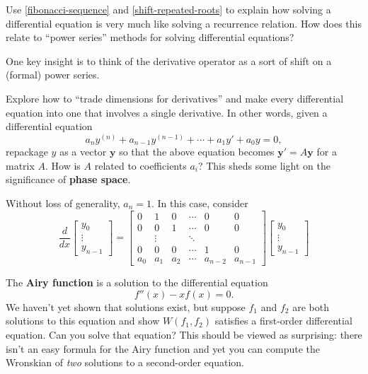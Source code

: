\documentclass{homework}
\begin{document}
\begin{problem}
  Use \ref{fibonacci-sequence} and \ref{shift-repeated-roots} to
  explain how solving a differential equation is very much like
  solving a recurrence relation.  How does this relate to ``power
  series'' methods for solving differential equations?
\end{problem}

\begin{solution}
  One key insight is to think of the derivative operator as a sort of
  shift on a (formal) power series.
\end{solution}

\begin{problem}\label{introduction-phase-space}Explore how to ``trade dimensions for derivatives'' and make every differential equation into one that involves a single derivative.  In other words, given a differential equation
  \[
    a_n y^{(n)} + a_{n-1} y^{(n-1)} + \cdots + a_1 y' + a_0 y  = 0,
  \]
  repackage $y$ as a vector $\textbf{y}$ so that the above equation becomes $\textbf{y}' = A \textbf{y}$ for a matrix $A$.  How is $A$ related to coefficients $a_i$?  This sheds some light on the significance of \textbf{phase space}.
\end{problem}

\begin{solution}
  Without loss of generality, $a_n = 1$.  In this case, consider
  \[
    \frac{d}{dx} \begin{bmatrix} y_0 \\ \vdots \\ y_{n-1} \end{bmatrix} =
    \begin{bmatrix}
      0 & 1 & 0 & \cdots & 0 & 0\\
      0 & 0 & 1 & \cdots & 0 & 0 \\
        & \vdots &   & \ddots \\
      0 & 0 & 0 & \cdots & 1 & 0\\
      a_0 & a_1 & a_2 & \cdots & a_{n-2} & a_{n-1}
    \end{bmatrix} \begin{bmatrix} y_0 \\ \vdots \\ y_{n-1} \end{bmatrix}
  \]

  
\end{solution}

\begin{problem}\label{introduction-airy-function}The \textbf{Airy function} is a solution to the differential equation
  \[
    f''(x) - x f(x) = 0.
  \]
  We haven't yet shown that solutions exist, but suppose $f_1$ and
  $f_2$ are both solutions to this equation and show $W(f_1,f_2)$
  satisfies a first-order differential equation.  Can you solve that
  equation?  This should be viewed as surprising: there isn't an easy
  formula for the Airy function and yet you can compute the Wronskian
  of \textit{two} solutions to a second-order equation.
\end{problem}
\end{document}
